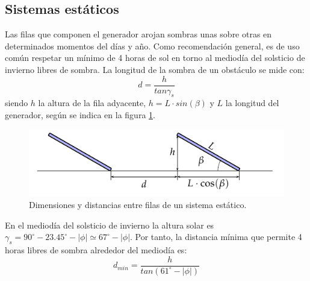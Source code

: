 \subsection{Sistemas estáticos}
\label{sec:orge7bb9c0}
Las filas que componen el generador arojan sombras unas sobre otras en determinados momentos del días y año. Como recomendación general, es de uso común respetar un mínimo de 4 horas de sol en torno al mediodía del solsticio de invierno libres de sombra. La longitud de la sombra de un obstáculo se mide con:
\begin{equation}
d = \frac{h}{tan\gamma_s}
\end{equation}
siendo \(h\) la altura de la fila adyacente, \(h=L\cdot sin(\beta)\) y \(L\) la longitud del generador, según se indica en la figura \ref{fig:sombras-estaticos}.
\begin{figure}[htbp]
\centering
\includegraphics[width=.9\linewidth]{figuras/SombrasEstaticas.pdf}
\caption{Dimensiones y distancias entre filas de un sistema estático. \label{fig:sombras-estaticos}}
\end{figure}

En el mediodía del solsticio de invierno la altura solar es \(\gamma_s = 90^\circ - 23.45^\circ - |\phi| \simeq 67^\circ - |\phi|\). Por tanto, la distancia mínima que permite 4 horas libres de sombra alrededor del mediodía es:
\begin{equation}
d_{min}=\frac{h}{tan(61^\circ - |\phi|)}
\end{equation}

